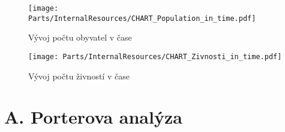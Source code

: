 \begin{figure}[!hbtp]
	\centering
	\texttt{[image: Parts/InternalResources/CHART\_Population\_in\_time.pdf]}
	\caption[Vývoj počtu obyvatel v čase]{Vývoj počtu obyvatel v čase}
	\label{fig:Vyvoj poctu obyvatel v case}
\end{figure}

\newpage

\begin{figure}[!hbtp]
	\centering
	\texttt{[image: Parts/InternalResources/CHART\_Zivnosti\_in\_time.pdf]}
	\caption[Vývoj počtu živností v čase]{Vývoj počtu živností v čase}
	\label{fig:Vyvoj poctu zivnosti v case}
\end{figure}

\newpage

\section*{A. Porterova analýza}
\label{sec:Porterova analyza}
